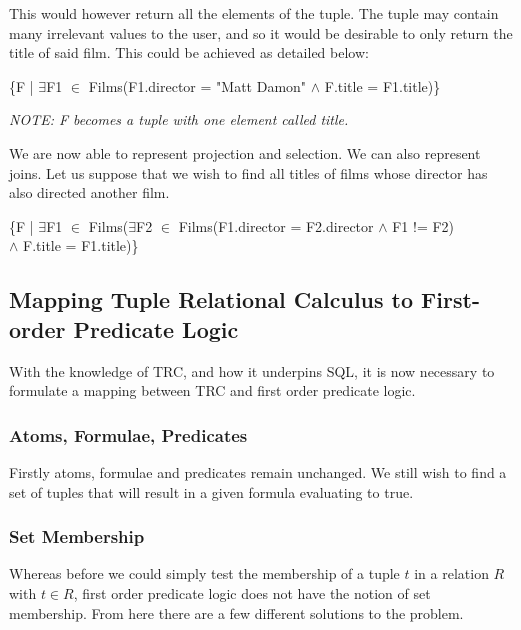 \documentclass[a4paper, 11pt]{article}
\begin{document}
      This would however return all the elements of the tuple. The tuple may
      contain many irrelevant values to the user, and so it would be desirable
      to only return the title of said film. This could be achieved as detailed
      below:

      \begin{center}
        \{F | $\exists$F1 $\in$ Films(F1.director = "Matt Damon" $\land$ 
          F.title = F1.title)\}
      
        \emph{NOTE: F becomes a tuple with one element called title.}
      \end{center}

      We are now able to represent projection and selection. We can also
      represent joins. Let us suppose that we wish to find all titles of films
      whose director has also directed another film.

      \begin{center}
        \{F | $\exists$F1 $\in$ Films($\exists$F2 $\in$ 
        Films(F1.director = F2.director $\land$ F1 != F2)
        \\ $\land$ F.title = F1.title)\}
      \end{center}

\subsection{Mapping Tuple Relational Calculus to First-order Predicate Logic}
    With the knowledge of TRC, and how it underpins SQL, it is now necessary to
    formulate a mapping between TRC and first order predicate logic.

    \subsubsection{Atoms, Formulae, Predicates}
      Firstly atoms, formulae and predicates remain unchanged. We still wish to
      find a set of tuples that will result in a given formula evaluating to
      true.

    \subsubsection{Set Membership}
      Whereas before we could simply test the membership of a tuple $t$ in a
      relation $R$ with $t \in R$, first order predicate logic does not have
      the notion of set membership. From here there are a few different
      solutions to the problem.
\end{document}
